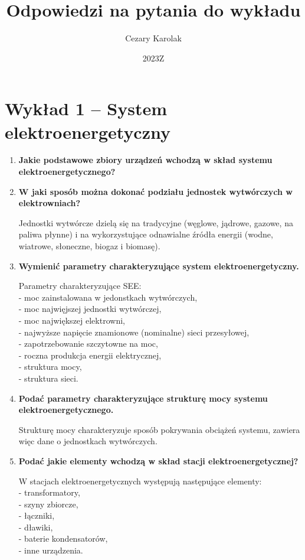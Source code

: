 \documentclass[12pt]{article}
\title{Odpowiedzi na pytania do wykładu}
\author{Cezary Karolak}
\date{2023Z}
\begin{document}
\maketitle
\tableofcontents
\newpage

\section{Wykład 1 -- System elektroenergetyczny}
\begin{enumerate}
    \item \textbf{Jakie podstawowe zbiory urządzeń wchodzą w skład systemu elektroenergetycznego?}
    
    \item \textbf{W jaki sposób można dokonać podziału jednostek wytwórczych w elektrowniach?}
    
        Jednostki wytwórcze dzielą się na tradycyjne (węglowe, jądrowe, gazowe, na paliwa płynne) 
        i na wykorzystujące odnawialne źródła energii (wodne, wiatrowe, słoneczne, biogaz i biomasę).

    \item \textbf{Wymienić parametry charakteryzujące system elektroenergetyczny.}
    
        Parametry charakteryzujące SEE:\\
        - moc zainstalowana w jedonstkach wytwórczych,\\
        - moc najwięjszej jednostki wytwórczej,\\
        - moc największej elektrowni,\\
        - najwyższe napięcie znamionowe (nominalne) sieci przesyłowej,\\
        - zapotrzebowanie szczytowne na moc,\\
        - roczna produkcja energii elektrycznej,\\
        - struktura mocy,\\
        - struktura sieci.

    \item \textbf{Podać parametry charakteryzujące strukturę mocy systemu elektroenergetycznego.}
    
        Strukturę mocy charakteryzuje sposób pokrywania obciążeń systemu, zawiera więc dane o jednostkach wytwórczych.

    \item \textbf{Podać jakie elementy wchodzą w skład stacji elektroenergetycznej?}
    
        W stacjach elektroenergetycznych występują następujące elementy:\\
        - transformatory,\\
        - szyny zbiorcze,\\
        - łączniki,\\
        - dławiki,\\
        - baterie kondensatorów,\\
        - inne urządzenia.


\end{enumerate}
\end{document}
